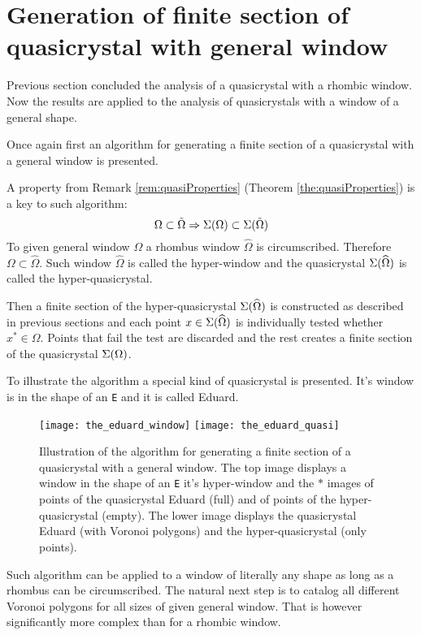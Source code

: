 \documentclass[text.tex]{subfiles}
\begin{document}
\pagestyle{plain}
\section{Generation of finite section of quasicrystal with general window}
Previous section concluded the analysis of a quasicrystal with a rhombic window. Now the results are applied to the analysis of quasicrystals with a window of a general shape. 

Once again first an algorithm for generating a finite section of a quasicrystal with a general window is presented.

A property from Remark \ref{rem:quasiProperties} (Theorem \ref{the:quasiProperties}) is a key to such algorithm:
$$\Omega \subset \tilde{\Omega} \Rightarrow \Sigma(\Omega) \subset \Sigma(\tilde{\Omega})$$
To given general window $\Omega$ a rhombus window $\widehat{\Omega}$ is circumscribed. Therefore $\Omega\subset\widehat{\Omega}$. Such window $\widehat{\Omega}$ is called the hyper-window and the quasicrystal $\Sigma(\widehat{\Omega})$ is called the hyper-quasicrystal. 

Then a finite section of the hyper-quasicrystal $\Sigma(\widehat{\Omega})$ is constructed as described in previous sections and each point $x\in\Sigma(\widehat{\Omega})$ is individually tested whether $x^\ast\in\Omega$. Points that fail the test are discarded and the rest creates a finite section of the quasicrystal $\Sigma(\Omega)$.

To illustrate the algorithm a special kind of quasicrystal is presented. It's window is in the shape of an \texttt{E} and it is called Eduard.
\begin{figure}[h!]
\centering
\texttt{[image: the\_eduard\_window]}
\texttt{[image: the\_eduard\_quasi]}
\caption{Illustration of the algorithm for generating a finite section of a quasicrystal with a general window. The top image displays a window in the shape of an \texttt{E} it's hyper-window and the $\ast$ images of points of the quasicrystal Eduard (full) and of points of the hyper-quasicrystal (empty). The lower image displays the quasicrystal Eduard (with Voronoi polygons) and the hyper-quasicrystal (only points).}
\end{figure}

Such algorithm can be applied to a window of literally any shape as long as a rhombus can be circumscribed. The natural next step is to catalog all different Voronoi polygons for all sizes of given general window. That is however significantly more complex than for a rhombic window.
\end{document}
